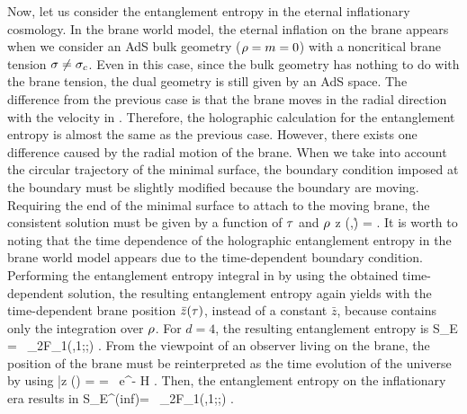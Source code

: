 \documentclass[12pt]{article}
\begin{document}
Now, let us consider the entanglement entropy in the eternal inflationary cosmology. In the brane world model, the eternal inflation on the brane appears when we consider an AdS bulk geometry ($\rho=m=0$) with a noncritical brane tension $\sigma \ne \sigma_c$. Even in this case, since the bulk geometry has nothing to do with the brane tension, the dual geometry is still given by an AdS space. The difference from the previous case is that the brane moves in the radial direction with the velocity in . Therefore, the holographic calculation for the entanglement entropy is almost the same as the previous case. However, there exists one difference caused by the radial motion of the brane. When we take into account the circular trajectory of the minimal surface, the boundary condition imposed at the boundary must be slightly modified because the boundary are moving. Requiring the end of the minimal surface to attach to the moving brane, the consistent solution must be given by a function of $\tau$ and $\rho$ 
\be
z (\ta,\r) =  .
\ee
It is worth to noting that the time dependence of the holographic entanglement entropy in the brane world model appears due to the time-dependent boundary condition. Performing the entanglement entropy integral in  by using the obtained time-dependent solution, the resulting entanglement entropy again yields  with the time-dependent brane position $\bar{z}(\tau)$, instead of a constant $\bar{z}$, because  contains only the integration over $\rho$. For $d=4$, the resulting entanglement entropy is
\be				{}	
S_E =    \, _2F_1\left(,1;;\right)  .
\ee
From the viewpoint of an observer living on the brane, the position of the brane must be reinterpreted as the time evolution of the universe by using 
\be
\bar{z} (\ta) =  =  \ e^{- H \ta} .
\ee
Then, the entanglement entropy on the inflationary era results in
\be
S_E^{(inf)}=   \, _2F_1\left(,1;;\right)   .
\ee
\end{document}
